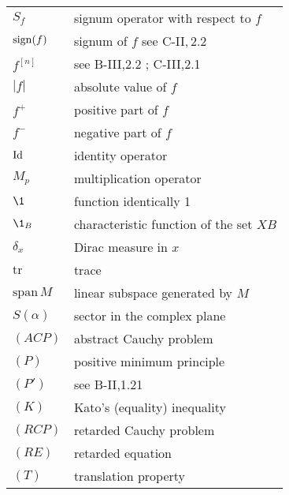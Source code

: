 \begin{longtable}{p{}p{}}
$S_{f}$ & signum operator with respect to $f$ \\ %
$\operatorname{sign}(f)$ & signum of $f$ see C-II,\,2.2 \\ %
$f^{[n]}$ & see B-III,2.2 ; C-III,2.1 \\ %
$|f|$ & absolute value of $f$ \\ %
$f^{+}$ & positive part of $f$ \\ %
$f^{-}$ & negative part of $f$ \\ %
%
%
%
$\operatorname{Id}$ & identity operator \\ %
$M_{p}$ & multiplication operator \\ %
$\1$ & function identically 1 \\ %
$\1_{B}$ & characteristic function of the set $XB$ \\ %
$\delta_{x}$ & Dirac measure in $x$ \\ %
$\text{tr}$ & trace \\ %
$\text{span}\,M$ & linear subspace generated by $M$ \\ %
$S(\alpha)$ & sector in the complex plane \\ %
$(ACP)$ & abstract Cauchy problem \\ %
$(P)$ & positive minimum principle \\ %
$(P')$ & see B-II,1.21 \\ %
$(K)$ & Kato's (equality) inequality \\ %
$(RCP)$ & retarded Cauchy problem \\ %
$(RE)$ & retarded equation \\ %
$(T)$ & translation property \\ %
\end{longtable}
